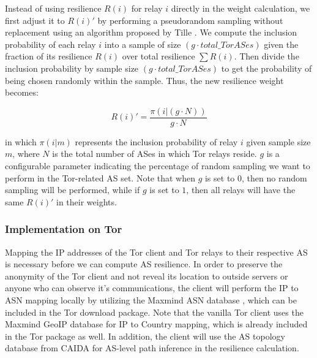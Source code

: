 Instead of using resilience $R(i)$ for relay $i$ directly in the weight calculation, we first adjust it to $R(i)\prime$ by performing a pseudorandom sampling without replacement using an algorithm proposed by Tille . We compute the inclusion probability of each relay $i$ into a sample of size $(g \cdot total\_TorASes)$ given the fraction of its resilience $R(i)$ over total resilience $\sum R(i)$.  Then divide the inclusion probability by sample size $(g \cdot total\_TorASes)$ to get the probability of being chosen randomly within the sample. Thus, the new resilience weight becomes:

\begin{equation*}
R(i) \prime = \frac {\pi(i | (g \cdot N))} {g \cdot N}
\end{equation*}

in which $\pi(i | m)$ represents the inclusion probability of relay $i$ given sample size $m$, where $N$ is the total number of ASes in which Tor relays reside. $g$ is a configurable parameter indicating the percentage of random sampling we want to perform in the Tor-related AS set. Note that when $g$ is set to $0$, then no random sampling will be performed, while if $g$ is set to $1$, then all relays will have the same $R(i)\prime$ in their weights.


\subsubsection{Implementation on Tor}
Mapping the IP addresses of the Tor client and Tor relays to their respective AS is necessary before we can compute AS resilience. In order to preserve the anonymity of the Tor client and not reveal its location to outside servers or anyone who can observe it's communications, the client will perform the IP to ASN mapping locally by utilizing the Maxmind ASN database , which can be included in the Tor download package. Note that the vanilla Tor client uses the Maxmind GeoIP database for IP to Country mapping, which is already included in the Tor package as well. In addition, the client will use the AS topology database from CAIDA \cite{caida} for AS-level path inference in the resilience calculation. 

